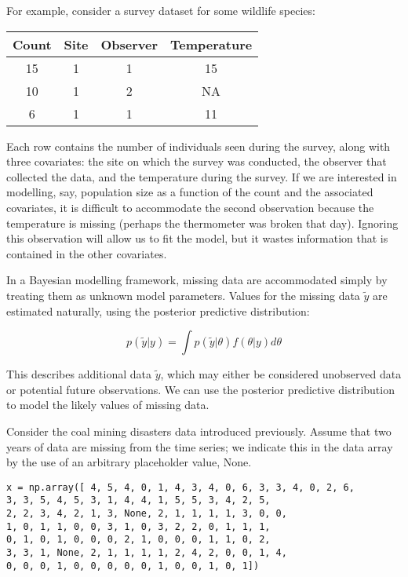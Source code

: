 For example, consider a survey dataset for some wildlife species:

\begin{center}
\begin{tabular}{cccc}
\hline
Count & Site & Observer & Temperature\\
\hline
15 & 1 & 1 & 15\\
10 & 1 & 2 & NA\\
6 & 1 & 1 & 11\\
\hline
\end{tabular}
\end{center}

Each row contains the number of individuals seen during the survey, along with three covariates: the site on which the survey was conducted, the observer that collected the data, and the temperature during the survey. If we are interested in modelling, say, population size as a function of the count and the associated covariates, it is difficult to accommodate the second observation because the temperature is missing (perhaps the thermometer was broken that day). Ignoring this observation will allow us to fit the model, but it wastes information that is contained in the other covariates.

In a Bayesian modelling framework, missing data are accommodated simply by treating them as unknown model parameters. Values for the missing data $\tilde{y}$ are estimated naturally, using the posterior predictive distribution:

\begin{equation}
	p(\tilde{y}|y) = \int p(\tilde{y}|\theta) f(\theta|y) d\theta
\end{equation}

This describes additional data $\tilde{y}$, which may either be considered unobserved data or potential future observations. We can use the posterior predictive distribution to model the likely values of missing data.

Consider the coal mining disasters data introduced previously. Assume that two years of data are missing from the time series; we indicate this in the data array by the use of an arbitrary placeholder value, None.

\begin{verbatim}
x = np.array([ 4, 5, 4, 0, 1, 4, 3, 4, 0, 6, 3, 3, 4, 0, 2, 6,
3, 3, 5, 4, 5, 3, 1, 4, 4, 1, 5, 5, 3, 4, 2, 5,
2, 2, 3, 4, 2, 1, 3, None, 2, 1, 1, 1, 1, 3, 0, 0,
1, 0, 1, 1, 0, 0, 3, 1, 0, 3, 2, 2, 0, 1, 1, 1,
0, 1, 0, 1, 0, 0, 0, 2, 1, 0, 0, 0, 1, 1, 0, 2,
3, 3, 1, None, 2, 1, 1, 1, 1, 2, 4, 2, 0, 0, 1, 4,
0, 0, 0, 1, 0, 0, 0, 0, 0, 1, 0, 0, 1, 0, 1])
\end{verbatim}

